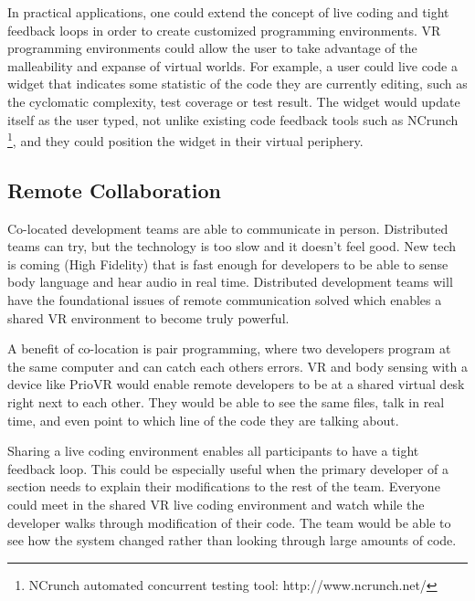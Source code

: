 \documentclass{acm_proc_article-sp}
\begin{document}
In practical applications, one could extend the concept of live coding and tight feedback loops in order to create customized programming environments. VR programming environments could allow the user to take advantage of the malleability and expanse of virtual worlds. For example, a user could live code a widget that indicates some statistic of the code they are currently editing, such as the cyclomatic complexity, test coverage or test result. The widget would update itself as the user typed, not unlike existing code feedback tools such as NCrunch \footnote{NCrunch automated concurrent testing tool: http://www.ncrunch.net/}, and they could position the widget in their virtual periphery.

\subsection{Remote Collaboration}


Co-located development teams are able to communicate in person. Distributed teams can try, but the technology is too slow and it doesn't feel good. New tech is coming (High Fidelity) that is fast enough for developers to be able to sense body language and hear audio in real time.  Distributed development teams will have the foundational issues of remote communication solved which enables a shared VR environment to become truly powerful.

A benefit of co-location is pair programming, where two developers program at the same computer and can catch each others errors. VR and body sensing with a device like PrioVR would enable remote developers to be at a shared virtual desk right next to each other. They would be able to see the same files, talk in real time, and even point to which line of the code they are talking about. 

Sharing a live coding environment enables all participants to have a tight feedback loop. This could be especially useful when the primary developer of a section needs to explain their modifications to the rest of the team. Everyone could meet in the shared VR live coding environment and watch while the developer walks through modification of their code. The team would be able to see how the system changed rather than looking through large amounts of code.
\end{document}
